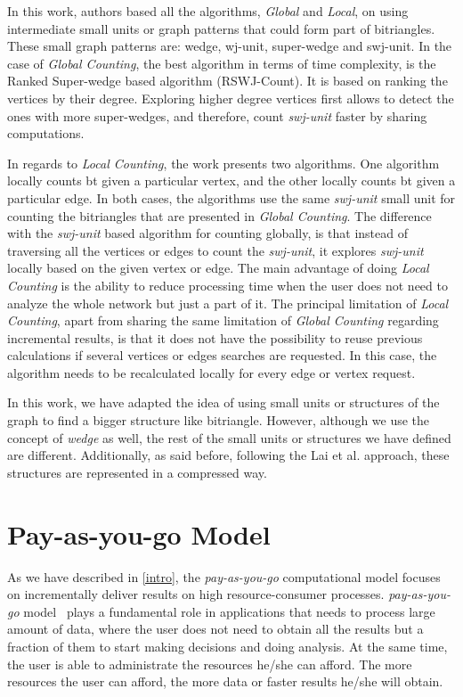 In this work, authors based all the algorithms, \emph{Global} and \emph{Local}, on using intermediate small units or graph patterns that could form part of  bitriangles. These small graph patterns are: wedge, wj-unit, super-wedge and swj-unit.
In the case of \emph{Global Counting}, the best algorithm in terms of time complexity, is the Ranked Super-wedge based algorithm (RSWJ-Count). 
It is based on ranking the vertices by their degree. Exploring higher degree vertices first allows to detect the ones with more super-wedges, and therefore, count \emph{swj-unit} faster by sharing computations. 

In regards to \emph{Local Counting}, the work presents two algorithms. One algorithm locally counts \acrshort{bt} given a particular vertex, and the other locally counts \acrshort{bt} given a particular edge. 
In both cases, the algorithms use the same \emph{swj-unit} small unit for counting the bitriangles that are presented in \emph{Global Counting}. The difference with the \emph{swj-unit} based algorithm for counting globally, is that instead of traversing all the vertices or edges to count the \emph{swj-unit}, it explores \emph{swj-unit} locally based on the given vertex or edge.
The main advantage of doing \emph{Local Counting} is the ability to reduce processing time when the user does not need to analyze the whole network but just a part of it.
The principal limitation of \emph{Local Counting}, apart from sharing the same limitation of \emph{Global Counting} regarding incremental results, is that it does not have the possibility to reuse previous calculations if several vertices or edges searches are requested. 
In this case, the algorithm needs to be recalculated locally for every edge or vertex request.

In this work, we have adapted the idea of using small units or structures of the graph to find a bigger structure like bitriangle. However, although we use the concept of \emph{wedge} as well, the rest of the small  units or structures we have defined are different. Additionally, as said before, following the Lai et al. approach, these structures are represented in a compressed way. 


\section{Pay-as-you-go Model}
As we have described in \autoref{intro}, the \emph{pay-as-you-go} computational model focuses on incrementally deliver results on high resource-consumer processes.
\emph{pay-as-you-go} model~\cite{factcatch} plays a fundamental role in applications that needs to process large amount of data, where the user does not need to obtain all the results but a fraction of them to start making decisions and doing analysis.
At the same time, the user is able to administrate the resources he/she can afford. The more resources the user can afford, the more data or faster results he/she will obtain.


